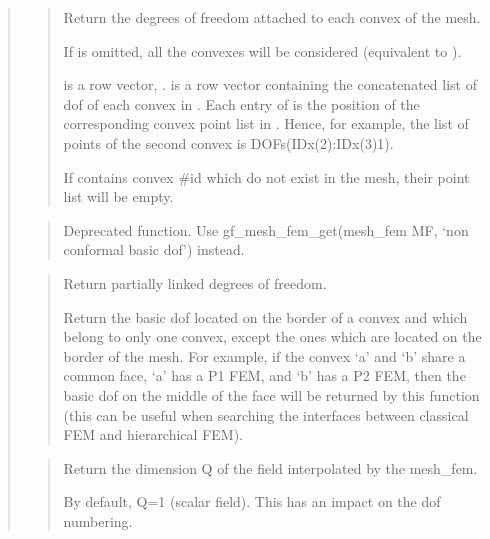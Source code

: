 \documentclass[a4paper,11pt,english]{sphinxmanual}
\begin{document}
\begin{quote}
\begin{quote}
Return the degrees of freedom attached to each convex of the mesh.

If  is omitted, all the convexes will be considered (equivalent
to ).

 is a row vector, .
 is a row vector containing the concatenated list
of dof of each convex in . Each entry of  is the position
of the corresponding convex point list in . Hence, for example,
the list of points of the second convex is DOFs(IDx(2):IDx(3)\sphinxhyphen{}1).

If  contains convex \#id which do not exist in the mesh, their
point list will be empty.
\end{quote}

\begin{quote}

Deprecated function. Use gf\_mesh\_fem\_get(mesh\_fem MF, ‘non conformal basic dof’) instead.
\end{quote}

\begin{quote}

Return partially linked degrees of freedom.

Return the basic dof located on the border of a convex and which belong
to only one convex, except the ones which are located on the border
of the mesh.  For example, if the convex ‘a’ and ‘b’ share a common
face, ‘a’ has a P1 FEM, and ‘b’ has a P2 FEM, then the basic dof on the
middle of the face will be returned by this function (this can be
useful when searching the interfaces between classical FEM and
hierarchical FEM).
\end{quote}

\begin{quote}

Return the dimension Q of the field interpolated by the mesh\_fem.

By default, Q=1 (scalar field). This has an impact on the dof numbering.
\end{quote}


\end{quote}
\end{document}
